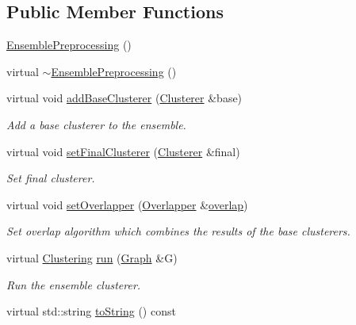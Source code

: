 \subsection*{Public Member Functions}
\begin{DoxyCompactItemize}
\item 
\hyperlink{class_ensemble_clustering_1_1_ensemble_preprocessing_ab47d270e6a2ac5e639a663cc74fdcbab}{Ensemble\-Preprocessing} ()
\item 
virtual \hyperlink{class_ensemble_clustering_1_1_ensemble_preprocessing_a3f53a4e0b010445c01d2941cdc7e4993}{$\sim$\-Ensemble\-Preprocessing} ()
\item 
virtual void \hyperlink{class_ensemble_clustering_1_1_ensemble_preprocessing_af2ee7611342229e8ca45466a772908a7}{add\-Base\-Clusterer} (\hyperlink{class_ensemble_clustering_1_1_clusterer}{Clusterer} \&base)
\begin{DoxyCompactList}\small\item\em Add a base clusterer to the ensemble. \end{DoxyCompactList}\item 
virtual void \hyperlink{class_ensemble_clustering_1_1_ensemble_preprocessing_adf296229449fd7d80f27fb07da4a8273}{set\-Final\-Clusterer} (\hyperlink{class_ensemble_clustering_1_1_clusterer}{Clusterer} \&final)
\begin{DoxyCompactList}\small\item\em Set final clusterer. \end{DoxyCompactList}\item 
virtual void \hyperlink{class_ensemble_clustering_1_1_ensemble_preprocessing_a3ee26299a32e056eeca8ad783272f14e}{set\-Overlapper} (\hyperlink{class_ensemble_clustering_1_1_overlapper}{Overlapper} \&\hyperlink{class_ensemble_clustering_1_1_ensemble_preprocessing_a6f2615ff4946f64592f6c4ef727a34f7}{overlap})
\begin{DoxyCompactList}\small\item\em Set overlap algorithm which combines the results of the base clusterers. \end{DoxyCompactList}\item 
virtual \hyperlink{class_ensemble_clustering_1_1_clustering}{Clustering} \hyperlink{class_ensemble_clustering_1_1_ensemble_preprocessing_a85f74ed57d5d35b99db96ac2a9618f08}{run} (\hyperlink{class_ensemble_clustering_1_1_graph}{Graph} \&G)
\begin{DoxyCompactList}\small\item\em Run the ensemble clusterer. \end{DoxyCompactList}\item 
virtual std\-::string \hyperlink{class_ensemble_clustering_1_1_ensemble_preprocessing_abbd5ff18c5507f2867d9ff5a585e4331}{to\-String} () const 
\end{DoxyCompactItemize}
